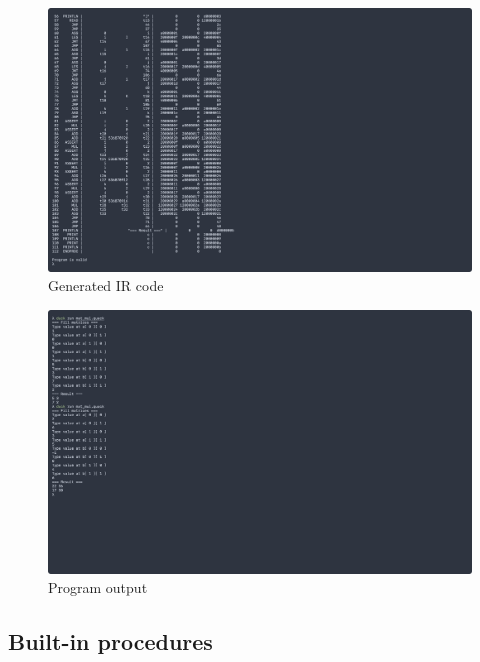 \begin{figure}[H]
    \centering
    \caption{Generated IR code}
    \includegraphics[width=\textwidth]{evidences/mat_mul_ir}
\end{figure}

\begin{figure}[H]
    \centering
    \caption{Program output}
    \includegraphics[width=\textwidth]{evidences/mat_mul_output}
\end{figure}

\newpage

\subsection{Built-in procedures}


